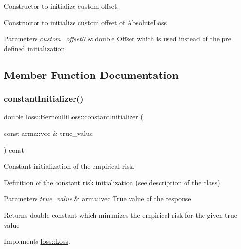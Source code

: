 Constructor to initialize custom offset. 

Constructor to initialize custom offset of {\ttfamily \mbox{\hyperlink{classloss_1_1_absolute_loss}{Absolute\+Loss}}}


\begin{DoxyParams}{Parameters}
{\em custom\+\_\+offset0} & {\ttfamily double} Offset which is used instead of the pre defined initialization \\
\hline
\end{DoxyParams}


\subsection{Member Function Documentation}
\mbox{\label{classloss_1_1_bernoulli_loss_a1b5e26f446f30d690abc625349f563d1}} 
\subsubsection{\texorpdfstring{constant\+Initializer()}{constantInitializer()}}
{\footnotesize\ttfamily double loss\+::\+Bernoulli\+Loss\+::constant\+Initializer (\begin{DoxyParamCaption}\item[{const arma\+::vec \&}]{true\+\_\+value }\end{DoxyParamCaption}) const\hspace{0.3cm}{\ttfamily [virtual]}}



Constant initialization of the empirical risk. 

Definition of the constant risk initialization (see description of the class)


\begin{DoxyParams}{Parameters}
{\em true\+\_\+value} & {\ttfamily arma\+::vec} True value of the response\\
\hline
\end{DoxyParams}
\begin{DoxyReturn}{Returns}
{\ttfamily double} constant which minimizes the empirical risk for the given true value 
\end{DoxyReturn}


Implements \mbox{\hyperlink{classloss_1_1_loss_a65fe7dcd9370e6a549b8d1cc95fc8798}{loss\+::\+Loss}}.


